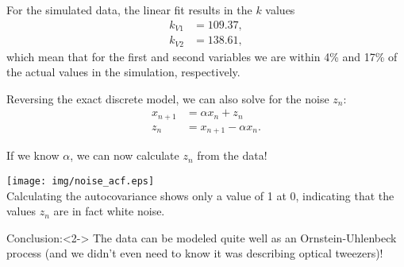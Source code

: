 \documentclass{beamer}
\begin{document}
\begin{frame}
For the simulated data, the linear fit results in the $k$ values
\begin{align*}
 k_{V1} &= 109.37,\\
 k_{V2} &= 138.61,
\end{align*}
which mean that for the first and second variables we are within 4\% and 17\% of the actual values in the simulation, respectively.

\end{frame}

\begin{frame}
Reversing the exact discrete model, we can also solve for the noise $z_n$:
\begin{align*}
x_{n+1} &= \alpha x_n + z_n \\
z_n &= x_{n+1} - \alpha x_n.
\end{align*}

If we know $\alpha$, we can now calculate $z_n$ from the data!
\end{frame}

\begin{frame}
\centering
\texttt{[image: img/noise\_acf.eps]}\\

Calculating the autocovariance shows only a value of 1 at 0, indicating that the values $z_n$ are in fact white noise.

\begin{block}{Conclusion:}<2->
The data can be modeled quite well as an Ornstein-Uhlenbeck process
(and we didn't even need to know it was describing optical tweezers)!
\end{block}
\end{frame}
\end{document}

